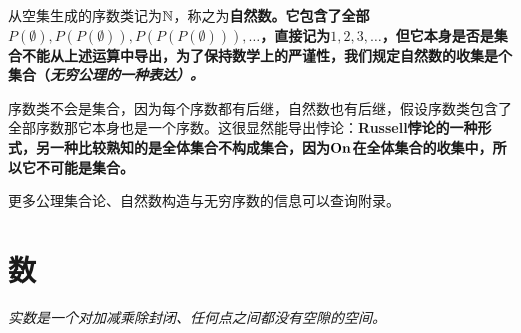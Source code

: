 从空集生成的序数类记为$\mathbb{N}$，称之为\bf{自然数}。它包含了全部$P(\emptyset),P(P(\emptyset)),P(P(P(\emptyset))),\ldots$，直接记为$1,2,3,\ldots$，但它本身是否是集合不能从上述运算中导出，为了保持数学上的严谨性，我们规定\bf{自然数的收集是个集合}（\it{无穷公理}的一种表达）。

序数类不会是集合，因为每个序数都有后继，自然数也有后继，假设序数类包含了全部序数那它本身也是一个序数。这很显然能导出悖论：\bf{Russell悖论}的一种形式，另一种比较熟知的是\bf{全体集合不构成集合}，因为$\mathbf{On}$在全体集合的收集中，所以它不可能是集合。

更多公理集合论、自然数构造与无穷序数的信息可以查询附录。


\section{数}

\begin{center}
	
	\it{实数是一个对加减乘除封闭、任何点之间都没有空隙的空间。}
	
\end{center}


